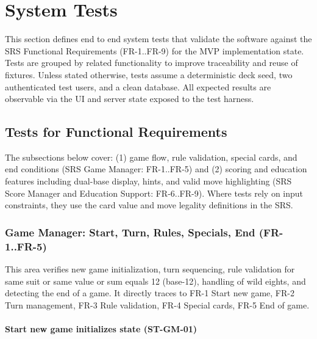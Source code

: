 \documentclass[12pt, titlepage]{article}
\begin{document}


\section{System Tests}

This section defines end to end system tests that validate the software against the SRS Functional Requirements (FR-1..FR-9) for the MVP implementation state. Tests are grouped by related functionality to improve traceability and reuse of fixtures. Unless stated otherwise, tests assume a deterministic deck seed, two authenticated test users, and a clean database. All expected results are observable via the UI and server state exposed to the test harness.

\subsection{Tests for Functional Requirements}

The subsections below cover: (1) game flow, rule validation, special cards, and end conditions (SRS Game Manager: FR-1..FR-5) and (2) scoring and education features including dual-base display, hints, and valid move highlighting (SRS Score Manager and Education Support: FR-6..FR-9). Where tests rely on input constraints, they use the card value and move legality definitions in the SRS.

\subsubsection{Game Manager: Start, Turn, Rules, Specials, End (FR-1..FR-5)}

This area verifies new game initialization, turn sequencing, rule validation for same suit or same value or sum equals 12 (base-12), handling of wild eights, and detecting the end of a game. It directly traces to FR-1 Start new game, FR-2 Turn management, FR-3 Rule validation, FR-4 Special cards, FR-5 End of game.

\paragraph{Start new game initializes state (ST-GM-01)}
\end{document}
